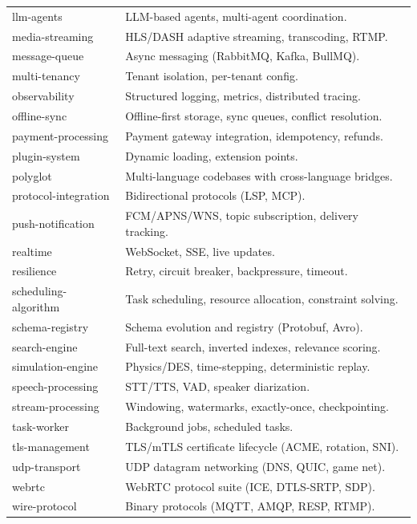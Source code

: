 \documentclass[11pt,a4paper,openright,twoside]{report}
\begin{document}
\begin{longtable}{lp{9cm}}
llm-agents & LLM-based agents, multi-agent coordination. \\
media-streaming & HLS/DASH adaptive streaming, transcoding, RTMP. \\
message-queue & Async messaging (RabbitMQ, Kafka, BullMQ). \\
multi-tenancy & Tenant isolation, per-tenant config. \\
observability & Structured logging, metrics, distributed tracing. \\
offline-sync & Offline-first storage, sync queues, conflict resolution. \\
payment-processing & Payment gateway integration, idempotency, refunds. \\
plugin-system & Dynamic loading, extension points. \\
polyglot & Multi-language codebases with cross-language bridges. \\
protocol-integration & Bidirectional protocols (LSP, MCP). \\
push-notification & FCM/APNS/WNS, topic subscription, delivery tracking. \\
realtime & WebSocket, SSE, live updates. \\
resilience & Retry, circuit breaker, backpressure, timeout. \\
scheduling-algorithm & Task scheduling, resource allocation, constraint solving. \\
schema-registry & Schema evolution and registry (Protobuf, Avro). \\
search-engine & Full-text search, inverted indexes, relevance scoring. \\
simulation-engine & Physics/DES, time-stepping, deterministic replay. \\
speech-processing & STT/TTS, VAD, speaker diarization. \\
stream-processing & Windowing, watermarks, exactly-once, checkpointing. \\
task-worker & Background jobs, scheduled tasks. \\
tls-management & TLS/mTLS certificate lifecycle (ACME, rotation, SNI). \\
udp-transport & UDP datagram networking (DNS, QUIC, game net). \\
webrtc & WebRTC protocol suite (ICE, DTLS-SRTP, SDP). \\
wire-protocol & Binary protocols (MQTT, AMQP, RESP, RTMP). \\
\bottomrule
\end{longtable}
\end{document}
